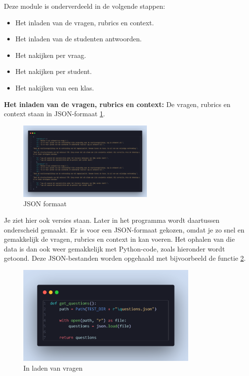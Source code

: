 \documentclass[12pt]{article}
\begin{document}
\noindent Deze module is onderverdeeld in de volgende stappen:
\begin{itemize} 
    \item Het inladen van de vragen, rubrics en context. 
    \item Het inladen van de studenten antwoorden. 
    \item Het nakijken per vraag.
    \item Het nakijken per student.
    \item Het nakijken van een klas.
\end{itemize}

\noindent\textbf{Het inladen van de vragen, rubrics en context:}
\noindent De vragen, rubrics en context staan in JSON-formaat \ref{fig:json_formaat}. \\
\begin{figure}[H] %
    \centering
    \includegraphics[width=0.6\textwidth]{./images/methoden/nakijken/json_structuur.png}
    \caption{JSON formaat}
    \label{fig:json_formaat}
\end{figure}
Je ziet hier ook versies staan. Later in het programma wordt daartussen onderscheid gemaakt. Er is voor een JSON-formaat gekozen, omdat je zo snel en gemakkelijk de vragen, rubrics en context in kan voeren. Het ophalen van die data is dan ook weer gemakkelijk met Python-code, zoals hieronder wordt getoond. Deze JSON-bestanden worden opgehaald met bijvoorbeeld de functie \ref{fig:vragen_inladen}.\\
\begin{figure}[H] %
    \centering
    \includegraphics[width=0.8\textwidth]{./images/methoden/nakijken/load_questions.png}
    \caption{In laden van vragen}
    \label{fig:vragen_inladen}
\end{figure}
\end{document}
